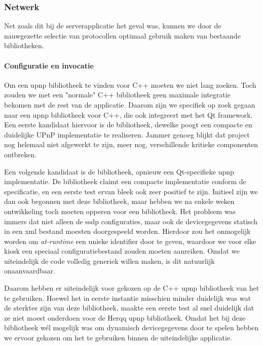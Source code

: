 \subsubsection{Netwerk}

Net zoals dit bij de serverapplicatie het geval was, kunnen we door de nauwgezette selectie van protocollen optimaal gebruik maken van bestaande bibliotheken.

\paragraph{Configuratie en invocatie} Om een \ac{upnp} bibliotheek te vinden voor C++ moeten we niet lang zoeken. Toch zouden we met een "normale" C++ bibliotheek geen maximale integratie bekomen met de rest van de applicatie. Daarom zijn we specifiek op zoek gegaan naar een \ac{upnp} bibliotheek voor C++, die ook integreert met het Qt framework. Een eerste kandidaat hiervoor is de  bibliotheek, dewelke poogt een compacte en duidelijke UPnP implementatie te realiseren. Jammer genoeg blijkt dat project nog helemaal niet afgewerkt te zijn, meer nog, verschillende kritieke componenten ontbreken.

Een volgende kandidaat is de  bibliotheek, opnieuw een Qt-specifieke \ac{upnp} implementatie. De bibliotheek claimt een compacte implementatie conform de specificatie, en een eerste test ervan bleek ook zeer positief te zijn. Initieel zijn we dan ook begonnen met deze bibliotheek, maar hebben we na enkele weken ontwikkeling toch moeten opperen voor een bibliotheek. Het probleem was immers dat niet alleen de \ac{ssdp} configuraties, maar ook de devicegegevens statisch in een \ac{xml} bestand moesten doorgespeeld worden. Hierdoor zou het onmogelijk worden om \emph{at-runtime} een unieke identifier door te geven, waardoor we voor elke kiosk een speciaal configuratiebestand zouden moeten aanreiken. Omdat we uiteindelijk de code volledig generiek willen maken, is dit natuurlijk onaanvaardbaar.

Daarom hebben er uiteindelijk voor gekozen op de C++ \ac{upnp} bibliotheek van het  te gebruiken. Hoewel het in eerste instantie misschien minder duidelijk was wat de sterktes zijn van deze bibliotheek, maakte een eerste test al snel duidelijk dat ze niet moest onderdoen voor de Herqq \ac{upnp} bibliotheek. Omdat het bij deze bibliotheek wél mogelijk was om dynamisch devicegegevens door te spelen hebben we ervoor gekozen om het te gebruiken binnen de uiteindelijke applicatie.

